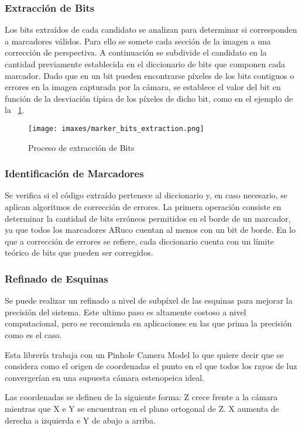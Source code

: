 \subsubsection*{Extracción de Bits}
Los bits extraídos de cada candidato se analizan para determinar si corresponden a marcadores válidos.
Para ello se somete cada sección de la imagen a una corrección de perspectiva. A continuación se subdivide el candidato en la cantidad previamente establecida en el diccionario de bits que componen cada marcador. Dado que en un bit pueden encontrarse píxeles de los bits contiguos o errores en la imagen capturada por la cámara, se establece el valor del bit en función de la desviación típica de los píxeles de dicho bit, como en el ejemplo de la \figurename~\ref{fig:mbe}.

\begin{figure}
  \centering
  \texttt{[image: imaxes/marker\_bits\_extraction.png]}
  \caption{Proceso de extracción de Bits}\label{fig:mbe}
\end{figure}

\subsubsection*{Identificación de Marcadores}
Se verifica si el código extraído pertenece al diccionario y, en caso necesario, se aplican algoritmos de corrección de errores.
La primera operación consiste en determinar la cantidad de bits erróneos permitidos en el borde de un marcador, ya que todos los marcadores ARuco cuentan al menos con un bit de borde. En lo que a corrección de errores se refiere, cada diccionario cuenta con un límite teórico de bits que pueden ser corregidos.

\subsubsection*{Refinado de Esquinas}
Se puede realizar un refinado a nivel de subpíxel de las esquinas para mejorar la precisión del sistema. Este ultimo paso es altamente costoso a nivel computacional, pero se recomienda en aplicaciones en las que prima la precisión como es el caso.

Esta librería trabaja con un Pinhole Camera Model lo que quiere decir que se considera como el origen de coordenadas el punto en el que todos los rayos de luz convergerían en una supuesta cámara estenopeica ideal.

Las coordenadas se definen de la siguiente forma: Z crece frente a la cámara mientras que X e Y se encuentran en el plano ortogonal de Z. X aumenta de derecha a izquierda e Y de abajo a arriba.







